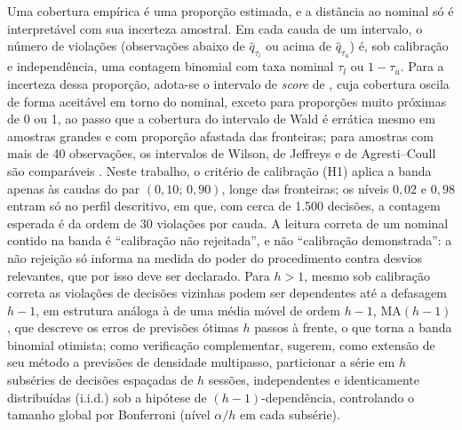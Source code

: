 Uma cobertura empírica é uma proporção estimada, e a distância ao nominal só é interpretável com sua incerteza amostral. Em cada cauda de um intervalo, o número de violações (observações abaixo de \(\hat{q}_{\tau_l}\) ou acima de \(\hat{q}_{\tau_u}\)) é, sob calibração e independência, uma contagem binomial com taxa nominal \(\tau_l\) ou \(1-\tau_u\). Para a incerteza dessa proporção, adota-se o intervalo de \textit{score} de , cuja cobertura oscila de forma aceitável em torno do nominal, exceto para proporções muito próximas de 0 ou 1, ao passo que a cobertura do intervalo de Wald é errática mesmo em amostras grandes e com proporção afastada das fronteiras; para amostras com mais de 40 observações, os intervalos de Wilson, de Jeffreys e de Agresti--Coull são comparáveis \cite{BROWN2001}. Neste trabalho, o critério de calibração (H1) aplica a banda apenas às caudas do par \((0{,}10;\,0{,}90)\), longe das fronteiras; os níveis \(0{,}02\) e \(0{,}98\) entram só no perfil descritivo, em que, com cerca de 1.500 decisões, a contagem esperada é da ordem de 30 violações por cauda. A leitura correta de um nominal contido na banda é ``calibração não rejeitada'', e não ``calibração demonstrada'': a não rejeição só informa na medida do poder do procedimento contra desvios relevantes, que por isso deve ser declarado. Para \(h > 1\), mesmo sob calibração correta as violações de decisões vizinhas podem ser dependentes até a defasagem \(h-1\), em estrutura análoga à de uma média móvel de ordem \(h-1\), MA\((h-1)\), que descreve os erros de previsões ótimas \(h\) passos à frente, o que torna a banda binomial otimista; como verificação complementar,  sugerem, como extensão de seu método a previsões de densidade multipasso, particionar a série em \(h\) subséries de decisões espaçadas de \(h\) sessões, independentes e identicamente distribuídas (i.i.d.) sob a hipótese de \((h-1)\)-dependência, controlando o tamanho global por Bonferroni (nível \(\alpha/h\) em cada subsérie).

